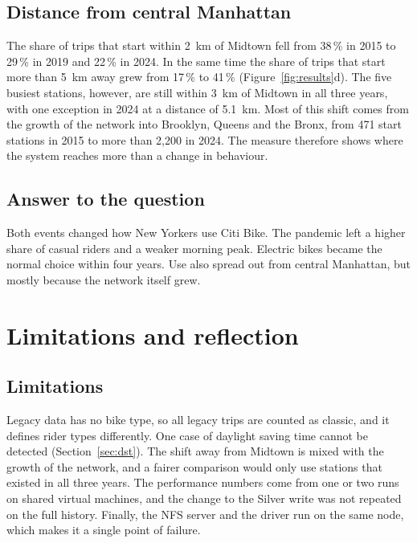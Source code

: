 \documentclass[11pt,a4paper]{article}
\begin{document}
\subsection{Distance from central Manhattan}

The share of trips that start within 2~km of Midtown fell from 38\,\% in 2015 to 29\,\% in 2019 and 22\,\% in 2024. In the
same time the share of trips that start more than 5~km away grew from 17\,\% to 41\,\% (Figure~\ref{fig:results}d). The five
busiest stations, however, are still within 3~km of Midtown in all three years, with one exception in 2024 at a distance of
5.1~km. Most of this shift comes from the growth of the network into Brooklyn, Queens and the Bronx, from 471 start stations
in 2015 to more than 2,200 in 2024. The measure therefore shows where the system reaches more than a change in behaviour.

\subsection{Answer to the question}

Both events changed how New Yorkers use Citi Bike. The pandemic left a higher share of casual riders and a weaker morning
peak. Electric bikes became the normal choice within four years. Use also spread out from central Manhattan, but mostly
because the network itself grew.

\section{Limitations and reflection}

\subsection{Limitations}

Legacy data has no bike type, so all legacy trips are counted as classic, and it defines rider types differently. One case
of daylight saving time cannot be detected (Section~\ref{sec:dst}). The shift away from Midtown is mixed with the growth of
the network, and a fairer comparison would only use stations that existed in all three years. The performance numbers come
from one or two runs on shared virtual machines, and the change to the Silver write was not repeated on the full history.
Finally, the NFS server and the driver run on the same node, which makes it a single point of failure.
\end{document}
